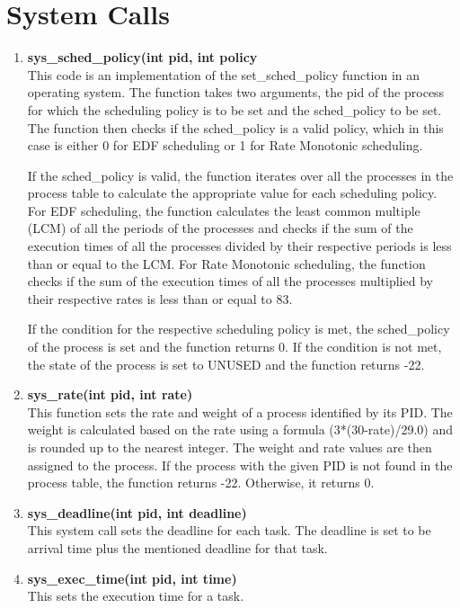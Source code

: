 \documentclass{article}
\begin{document}
\section{System Calls}
\begin{enumerate}
    \item \textbf{sys\_sched\_policy(int pid, int policy} \\
    This code is an implementation of the set\_sched\_policy function in an operating system. The function takes two arguments, the pid of the process for which the scheduling policy is to be set and the sched\_policy to be set. The function then checks if the sched\_policy is a valid policy, which in this case is either 0 for EDF scheduling or 1 for Rate Monotonic scheduling.

If the sched\_policy is valid, the function iterates over all the processes in the process table to calculate the appropriate value for each scheduling policy. For EDF scheduling, the function calculates the least common multiple (LCM) of all the periods of the processes and checks if the sum of the execution times of all the processes divided by their respective periods is less than or equal to the LCM. For Rate Monotonic scheduling, the function checks if the sum of the execution times of all the processes multiplied by their respective rates is less than or equal to 83.

If the condition for the respective scheduling policy is met, the sched\_policy of the process is set and the function returns 0. If the condition is not met, the state of the process is set to UNUSED and the function returns -22.

\item \textbf{sys\_rate(int pid, int rate)} \\ This function sets the rate and weight of a process identified by its PID. The weight is calculated based on the rate using a formula (3*(30-rate)/29.0) and is rounded up to the nearest integer. The weight and rate values are then assigned to the process. If the process with the given PID is not found in the process table, the function returns -22. Otherwise, it returns 0.
\item \textbf{sys\_deadline(int pid, int deadline)}\\ This system call sets the deadline for each task. The deadline is set to be arrival time plus the mentioned deadline for that task.

\item \textbf{sys\_exec\_time(int pid, int time)} \\This sets the execution time for a task.
    
\end{enumerate}
\end{document}
